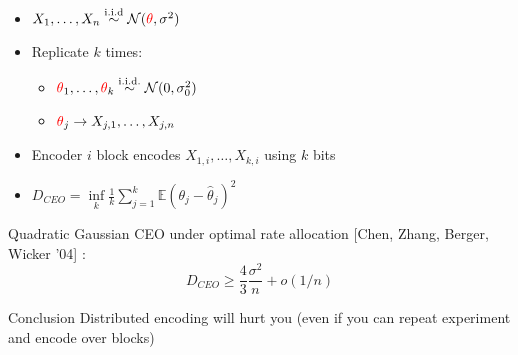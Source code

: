 \documentclass[mathserif]{beamer}
\newcommand{\thetac}{{\color{red} \theta}}
\newcommand{\iid}{\mathrm{i.i.d.}}
\begin{document}
\begin{frame}
\begin{center}
\end{center}
\begin{itemize}
\item $X_{1},\ldots,X_{n} \overset{\mathrm{i.i.d}}{\sim}\mathcal N(\thetac,\sigma^2)$
\pause
\item Replicate $k$ times: 
\begin{itemize}
\item  $\thetac_1,\ldots,\thetac_k \overset{\iid}{\sim} \mathcal N(0,\sigma_0^2)$ 
\item $\thetac_j \rightarrow X_{j,1},\ldots,X_{j,n}$
\end{itemize}
\pause
\item Encoder $i$ block encodes $X_{1,i},\ldots,X_{k,i}$ using $k$ bits
\pause
\item $D_{CEO} = \underset{k}{\inf} \frac{1}{k} \sum_{j=1}^k \mathbb E \left( \theta_j - \widehat{\theta}_j\right)^2$
\end{itemize}
\end{frame}

\begin{frame}
Quadratic Gaussian CEO under optimal rate allocation [Chen, Zhang, Berger, Wicker '04] :
\[
 D_{CEO}  \geq \frac{4}{3} \frac{\sigma^2}{n} + o(1/n) 
\]
\pause
\begin{alertblock}{Conclusion}
Distributed encoding will hurt you (even if you can repeat experiment and encode over blocks)
\end{alertblock}
\bigskip
\end{frame}
\end{document}
